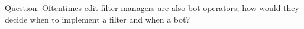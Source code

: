 Question:
Oftentimes edit filter managers are also bot operators; how would they decide when to implement a filter and when a bot?

